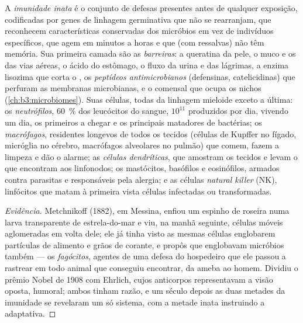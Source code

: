 \begin{definition}\label{def:b3:innate-immunity:innate}
A \emph{imunidade inata} é o conjunto de defesas presentes antes de
qualquer exposição, codificadas por genes de linhagem germinativa que
não se rearranjam, que reconhecem características conservadas dos
micróbios em vez de indivíduos específicos, que agem em minutos a horas
e que (com ressalvas) não têm memória. Sua primeira camada são as
\emph{barreiras}: a queratina da pele, o muco e os  das vias
aéreas, o ácido do estômago, o fluxo da urina e das lágrimas, a enzima
lisozima que corta o , os \emph{peptídeos
antimicrobianos} (defensinas, catelicidinas) que perfuram as membranas
microbianas, e o  comensal que ocupa os nichos
(\cref{ch:b3:microbiomes}). Suas células, todas da linhagem mieloide
exceto a última: os \emph{neutrófilos}, \qty{60}{\%} dos leucócitos do
sangue, $10^{11}$ produzidos por dia, vivendo um dia, os primeiros a
chegar e os principais matadores de bactérias; os \emph{macrófagos},
residentes longevos de todos os tecidos (células de Kupffer no fígado,
micróglia no cérebro, macrófagos alveolares no pulmão) que comem, fazem
a limpeza e dão o alarme; as \emph{células dendríticas}, que amostram os
tecidos e levam o que encontram aos linfonodos; os mastócitos, basófilos
e eosinófilos, armados contra parasitas e responsáveis pela alergia; e
as células \emph{natural killer} (NK), linfócitos que matam à primeira
vista células infectadas ou transformadas.
\end{definition}

\begin{proof}[Evidência]
Metchnikoff (1882), em Messina, enfiou um espinho de roseira numa larva
transparente de estrela-do-mar e viu, na manhã seguinte, células móveis
aglomeradas em volta dele; ele já tinha visto as mesmas células
englobarem partículas de alimento e grãos de corante, e propôs que
englobavam micróbios também --- os \emph{fagócitos}, agentes de uma
defesa do hospedeiro que ele passou a rastrear em todo animal que
conseguiu encontrar, da ameba ao homem. Dividiu o prêmio Nobel de 1908
com Ehrlich, cujos anticorpos representavam a visão oposta, humoral;
ambos tinham razão, e um século depois as duas metades da imunidade se
revelaram um só sistema, com a metade inata instruindo a adaptativa.
\end{proof}

